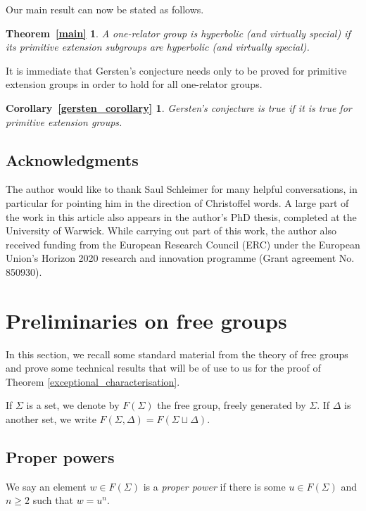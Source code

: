 \documentclass[11pt, a4paper]{amsart}
\theoremstyle{definition}
\newcommand{\fakeenv}{} %
\newenvironment{restate}[2]  %
{ 
 \renewcommand{\fakeenv}{#2} %
 \theoremstyle{plain} 
 \newtheorem*{\fakeenv}{#1~\ref{#2}} %
 \begin{\fakeenv}
}
{
 \end{\fakeenv}
}
\begin{document}
Our main result can now be stated as follows.


\begin{restate}{Theorem}{main}
A one-relator group is hyperbolic (and virtually special) if its primitive extension subgroups are hyperbolic (and virtually special).
\end{restate}

It is immediate that Gersten's conjecture \cite{gersten_92} needs only to be proved for primitive extension groups in order to hold for all one-relator groups.

\begin{restate}{Corollary}{gersten_corollary}
Gersten's conjecture is true if it is true for primitive extension groups.
\end{restate}


\subsection*{Acknowledgments} The author would like to thank Saul Schleimer for many helpful conversations, in particular for pointing him in the direction of Christoffel words. A large part of the work in this article also appears in the author's PhD thesis, completed at the University of Warwick. While carrying out part of this work, the author also received funding from the European Research Council (ERC) under the European Union's Horizon 2020 research and innovation programme (Grant agreement No. 850930).



\section{Preliminaries on free groups}

In this section, we recall some standard material from the theory of free groups and prove some technical results that will be of use to us for the proof of Theorem \ref{exceptional_characterisation}. 

If $\Sigma$ is a set, we denote by $F(\Sigma)$ the free group, freely generated by $\Sigma$. If $\Delta$ is another set, we write $F(\Sigma, \Delta) = F(\Sigma\sqcup\Delta)$.

\subsection{Proper powers}

We say an element $w\in F(\Sigma)$ is a \emph{proper power} if there is some $u\in F(\Sigma)$ and $n\geq 2$ such that $w = u^n$.
\end{document}
